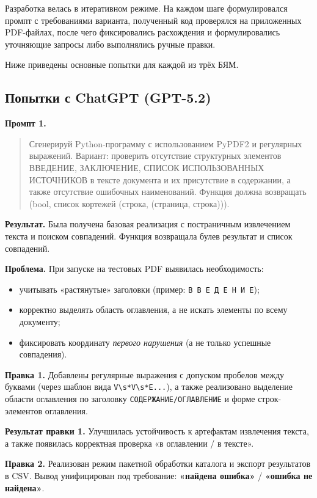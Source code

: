 Разработка велась в итеративном режиме. На каждом шаге формулировался промпт с требованиями варианта,
полученный код проверялся на приложенных PDF-файлах, после чего фиксировались расхождения
и формулировались уточняющие запросы либо выполнялись ручные правки.

Ниже приведены основные попытки для каждой из трёх БЯМ.

\subsection{Попытки с ChatGPT (GPT-5.2)}

\textbf{Промпт 1.}
\begin{quote}
Сгенерируй Python-программу с использованием PyPDF2 и регулярных выражений.
Вариант: проверить отсутствие структурных элементов ВВЕДЕНИЕ, ЗАКЛЮЧЕНИЕ,
СПИСОК ИСПОЛЬЗОВАННЫХ ИСТОЧНИКОВ в тексте документа и их присутствие в содержании,
а также отсутствие ошибочных наименований. Функция должна возвращать (bool, список кортежей
(строка, (страница, строка))).
\end{quote}

\textbf{Результат.} Была получена базовая реализация с постраничным извлечением текста и поиском совпадений.
Функция возвращала булев результат и список совпадений.

\textbf{Проблема.} При запуске на тестовых PDF выявилась необходимость:
\begin{itemize}
  \item учитывать «растянутые» заголовки (пример: \texttt{В В Е Д Е Н И Е});
  \item корректно выделять область оглавления, а не искать элементы по всему документу;
  \item фиксировать координату \emph{первого нарушения} (а не только успешные совпадения).
\end{itemize}

\textbf{Правка 1.} Добавлены регулярные выражения с допуском пробелов между буквами
(через шаблон вида \texttt{V\textbackslash s*V\textbackslash s*E...}),
а также реализовано выделение области оглавления по заголовку
\texttt{СОДЕРЖАНИЕ/ОГЛАВЛЕНИЕ} и форме строк-элементов оглавления.

\textbf{Результат правки 1.} Улучшилась устойчивость к артефактам извлечения текста,
а также появилась корректная проверка «в оглавлении / в тексте».

\textbf{Правка 2.} Реализован режим пакетной обработки каталога и экспорт результатов в CSV.
Вывод унифицирован под требование: \textbf{«найдена ошибка»} / \textbf{«ошибка не найдена»}.

